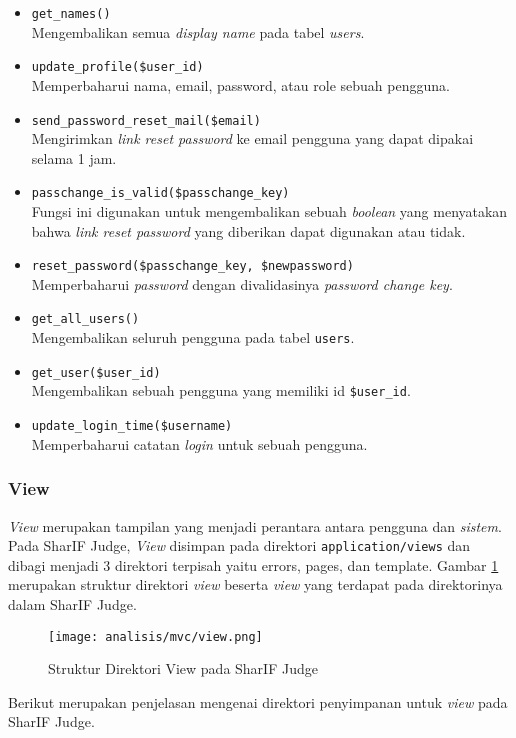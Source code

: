 \begin{itemize}
\begin{itemize}
		      \item \verb|get_names()| \\
		            Mengembalikan semua \textit{display name} pada tabel \textit{users}.
		      \item \verb|update_profile($user_id)| \\
		            Memperbaharui nama, email, password, atau role sebuah pengguna.
		      \item \verb|send_password_reset_mail($email)| \\
		            Mengirimkan \textit{link reset password} ke email pengguna yang dapat dipakai selama 1 jam.
		      \item \verb|passchange_is_valid($passchange_key)| \\
		            Fungsi ini digunakan untuk mengembalikan sebuah \textit{boolean} yang menyatakan bahwa \textit{link reset password} yang diberikan dapat digunakan atau tidak.
		      \item \verb|reset_password($passchange_key, $newpassword)| \\
		            Memperbaharui \textit{password} dengan divalidasinya \textit{password change key}.
		      \item \verb|get_all_users()| \\
		            Mengembalikan seluruh pengguna pada tabel \verb|users|.
		      \item \verb|get_user($user_id)| \\
		            Mengembalikan sebuah pengguna yang memiliki id \verb|$user_id|.
		      \item \verb|update_login_time($username)| \\
		            Memperbaharui catatan \textit{login} untuk sebuah pengguna.
	      \end{itemize}
\end{itemize}

\vspace{-0.5cm}

\subsubsection{View}
\label{sub:3:1:1:view}

\textit{View} merupakan tampilan yang menjadi perantara antara pengguna dan \textit{sistem}. Pada SharIF Judge, \textit{View} disimpan pada direktori \verb|application/views| dan dibagi menjadi 3 direktori terpisah yaitu errors, pages, dan template.
Gambar \ref{fig:3:1:1:view} merupakan struktur direktori \textit{view} beserta \textit{view} yang terdapat pada direktorinya dalam SharIF Judge.
\begin{figure}[H]
	\centering
	\texttt{[image: analisis/mvc/view.png]}
	\caption{Struktur Direktori View pada SharIF Judge}
	\label{fig:3:1:1:view}
\end{figure}
Berikut merupakan penjelasan mengenai direktori penyimpanan untuk \textit{view} pada SharIF Judge.

